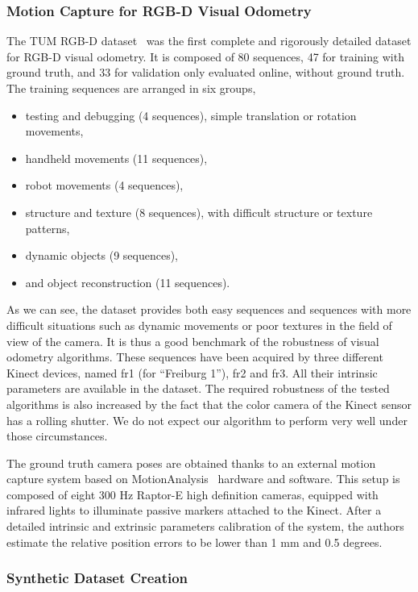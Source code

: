 \subsubsection{Motion Capture for RGB-D Visual Odometry}%
\label{ssub:motion_capture}

The TUM RGB-D dataset~\cite{sturm2012benchmark} was the first
complete and rigorously detailed dataset for RGB-D visual odometry.
It is composed of 80 sequences, 47 for training with ground truth,
and 33 for validation only evaluated online, without ground truth.
The training sequences are arranged in six groups,
\begin{itemize}
\setlength\itemsep{-0.5em}
	\item testing and debugging (4 sequences), simple translation or rotation movements,
	\item handheld movements (11 sequences),
	\item robot movements (4 sequences),
	\item structure and texture (8 sequences), with difficult structure or texture patterns,
	\item dynamic objects (9 sequences),
	\item and object reconstruction (11 sequences).
\end{itemize}
As we can see, the dataset provides both easy sequences and sequences with
more difficult situations such as dynamic movements or poor textures
in the field of view of the camera.
It is thus a good benchmark of the robustness of visual odometry algorithms.
These sequences have been acquired by three different Kinect devices,
named fr1 (for ``Freiburg 1''), fr2 and fr3.
All their intrinsic parameters are available in the dataset.
The required robustness of the tested algorithms is also increased by the fact that
the color camera of the Kinect sensor has a rolling shutter.
We do not expect our algorithm to perform very well under those circumstances.

The ground truth camera poses are obtained thanks to an external motion capture system
based on MotionAnalysis~\cite{MotionAnalysis} hardware and software.
This setup is composed of eight 300 Hz Raptor-E high definition cameras,
equipped with infrared lights to illuminate passive markers attached to the Kinect.
After a detailed intrinsic and extrinsic parameters calibration of the system,
the authors estimate the relative position errors to be lower than 1 mm and 0.5 degrees.

\subsubsection{Synthetic Dataset Creation}%
\label{ssub:synthetic_dataset}

